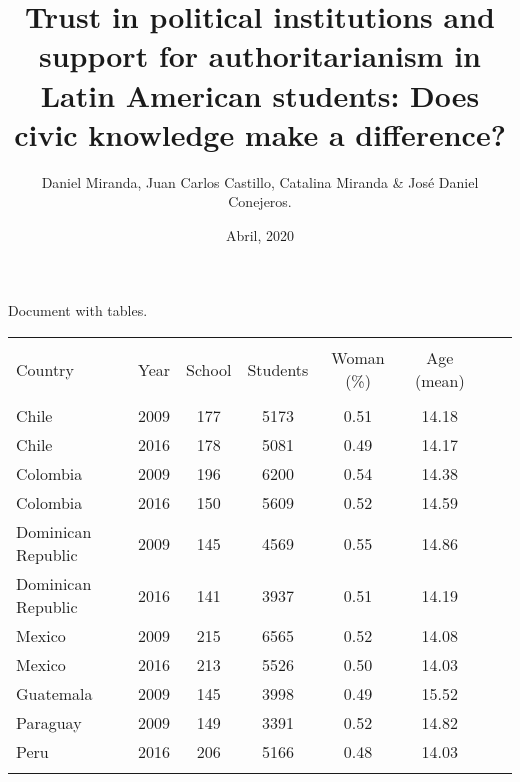\documentclass{article}
\title{Trust in political institutions and support for authoritarianism in Latin American students: Does civic knowledge make a difference?}
\author{Daniel Miranda, Juan Carlos Castillo, Catalina Miranda \& José Daniel Conejeros.}
\date{Abril, 2020}
\begin{document}
\maketitle

Document with tables. 


\begin{table}[h] 
\centering 
  \label{table:1} 
\begin{tabular}{@{\extracolsep{3pt}}lccccccc} 
\\[-5ex]
\hline \\[-3ex] 
Country & \multicolumn{1}{c}{Year} & \multicolumn{1}{c}{School} & \multicolumn{1}{c}{Students} & \multicolumn{1}{c}{Woman (\%)} & \multicolumn{1}{c}{Age (mean)} \\ 
\hline \\[-3.0ex] 
Chile & 2009 & 177 & 5173 & 0.51 & 14.18 \\ 
  Chile & 2016 & 178 & 5081 & 0.49 & 14.17 \\ 
  Colombia & 2009 & 196 & 6200 & 0.54 & 14.38 \\ 
  Colombia & 2016 & 150 & 5609 & 0.52 & 14.59 \\ 
  Dominican Republic & 2009 & 145 & 4569 & 0.55 & 14.86 \\ 
  Dominican Republic & 2016 & 141 & 3937 & 0.51 & 14.19 \\ 
  Mexico & 2009 & 215 & 6565 & 0.52 & 14.08 \\ 
  Mexico & 2016 & 213 & 5526 & 0.50 & 14.03 \\ 
  Guatemala & 2009 & 145 & 3998 & 0.49 & 15.52 \\ 
  Paraguay & 2009 & 149 & 3391 & 0.52 & 14.82 \\ 
  Peru & 2016 & 206 & 5166 & 0.48 & 14.03 \\ 
\hline \\[-1.8ex] 
\end{tabular} 
\end{table} 

\break
\end{document}
